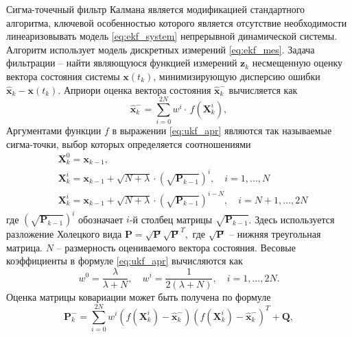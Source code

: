 Сигма-точечный фильтр Калмана является модификацией стандартного алгоритма, ключевой особенностью которого является отсутствие необходимости линеаризовывать модель \eqref{eq:ekf_system} непрерывной динамической системы. Алгоритм использует модель дискретных измерений \eqref{eq:ekf_mes}.
Задача фильтрации -- найти являющуюся функцией измерений $\bm z_k$ несмещенную оценку вектора состояния системы  $\bm x(t_k)$, минимизирующую дисперсию ошибки  ${\hat{\bm{x}}_k} - \bm x({t_k})$.
Априори оценка вектора состояния $\bm{\hat x}_k^-$ вычисляется как
\begin{equation} \label{eq:ukf_apr}
{\bm{\hat x}}_k^-  = \sum\limits_{i = 0}^{2N} {{w^i} \cdot } \,f\left( {{\bm{X}}_k^i} \right),
\end{equation}
Аргументами функции $f$ в выражении \eqref{eq:ukf_apr} являются так называемые сигма-точки, выбор которых определяется соотношениями
\begin{equation} \label{eq:ukf_points}
\begin{aligned}
&{{\bm{X}}_k^0 = {{\bm{x}}_{k - 1}}},
\\
&{{\bm{X}}_k^i = {{\bm{x}}_{k - 1}} + \sqrt {N + {{\lambda }}}  \cdot {{\left( {\sqrt {{{\bm{P}}_{k - 1}}} } \right)}^i}}, \quad {i = 1,...,N}
\\
&{{\bm{X}}_k^i = {{\bm{x}}_{k - 1}} + \sqrt {N + {{\lambda }}}  \cdot {{\left( {\sqrt {{{\bm{P}}_{k - 1}}} } \right)}^{i - N}}}, \quad {i = N + 1,...,2N}
\end{aligned}
\end{equation}
где
${{{\left( {\sqrt {{{\bm{P}}_{k - 1}}} } \right)}^i}}$
обозначает  $i$-й столбец матрицы ${\sqrt {{{\bm{P}}_{k - 1}}} }$.  Здесь используется разложение Холецкого \cite{Verbjitsky01} вида
${\bm{P}} = \sqrt {\bm{P}} {\sqrt {\bm{P}} ^T},$
где $\sqrt {\bm{P}}$ -- нижняя треугольная матрица. $N$ -- размерность оцениваемого вектора состояния. Весовые коэффициенты в формуле \eqref{eq:ukf_apr} вычисляются как
\begin{equation} \label{eq:ukf_weights}
{w^0} = \frac{{{\lambda }}}{{{{\lambda }} + N}},
\quad
{w^i} = \frac{1}{{2\left( {{{\lambda }} + N} \right)}},
\quad
i = 1,...,2N.
\end{equation}
Оценка матрицы ковариации может быть получена по формуле
\begin{equation} \label{eq:ukf_p_apr}
{\bm{P}}_k^ -  = \sum\limits_{i = 0}^{2N} {{w^i}\left( {f\left( {{\bm{X}}_k^i} \right) - {\bm{\hat x}}_k^ - } \right)} {\left( {f\left( {{\bm{X}}_k^i} \right) - {\bm{\hat x}}_k^ - } \right)^{{T}}} + {\bm{Q}},
\end{equation}
